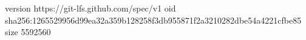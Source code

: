 version https://git-lfs.github.com/spec/v1
oid sha256:1265529956d99ea32a359b128258f3db955871f2a3210282dbe54a4221cfbe85
size 5592560
